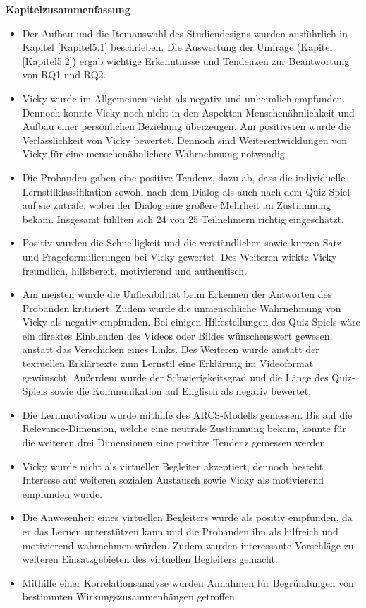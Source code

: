\textbf{Kapitelzusammenfassung} 
\begin{itemize}
    \item Der Aufbau und die Itemauswahl des Studiendesigns wurden ausführlich in Kapitel \ref{Kapitel5.1} beschrieben. Die Auswertung der Umfrage (Kapitel \ref{Kapitel5.2}) ergab wichtige Erkenntnisse und Tendenzen zur Beantwortung von RQ1 und RQ2.
    \item Vicky wurde im Allgemeinen nicht als negativ und unheimlich empfunden. Dennoch konnte Vicky noch nicht in den Aspekten Menschenähnlichkeit und Aufbau einer persönlichen Beziehung 
überzeugen. Am positivsten wurde die Verlässlichkeit von Vicky bewertet. Dennoch sind Weiterentwicklungen von Vicky für eine menschenähnlichere Wahrnehmung notwendig.
    \item Die Probanden gaben eine positive Tendenz, dazu ab, dass die individuelle Lernstilklassifikation sowohl nach dem Dialog als auch nach dem Quiz-Spiel auf sie zuträfe, wobei der Dialog eine größere Mehrheit an Zustimmung bekam. Insgesamt fühlten sich 24 von 25 Teilnehmern richtig eingeschätzt.
    \item Positiv wurden die Schnelligkeit und die verständlichen sowie kurzen Satz- und Frageformulierungen bei Vicky gewertet. Des Weiteren wirkte Vicky freundlich, hilfsbereit, motivierend und authentisch.
    \item Am meisten wurde die Unflexibilität beim Erkennen der Antworten des Probanden kritisiert. Zudem wurde die unmenschliche Wahrnehmung von Vicky als negativ empfunden.
    Bei einigen Hilfestellungen des Quiz-Spiels wäre ein direktes Einblenden des Videos oder Bildes wünschenswert gewesen, anstatt das Verschicken eines Links.
    Des Weiteren wurde anstatt der textuellen Erklärtexte zum Lernstil eine Erklärung im Videoformat gewünscht.
    Außerdem wurde der Schwierigkeitsgrad und die Länge des Quiz-Spiels sowie die Kommunikation auf Englisch als negativ bewertet.
    \item Die Lernmotivation wurde mithilfe des ARCS-Modells gemessen. Bis auf die Relevance-Dimension, welche eine neutrale Zustimmung bekam, konnte für die weiteren drei Dimensionen eine positive Tendenz gemessen werden.
    \item Vicky wurde nicht als virtueller Begleiter akzeptiert, dennoch besteht Interesse auf weiteren sozialen Austausch sowie Vicky als motivierend empfunden wurde.
    \item Die Anwesenheit eines virtuellen Begleiters wurde als positiv empfunden, da er das Lernen unterstützen kann und die Probanden ihn als hilfreich und motivierend wahrnehmen würden. Zudem wurden interessante Vorschläge zu weiteren Einsatzgebieten des virtuellen Begleiters gemacht.
    \item Mithilfe einer Korrelationsanalyse wurden Annahmen für Begründungen von bestimmten Wirkungszusammenhängen getroffen.
\end{itemize}

